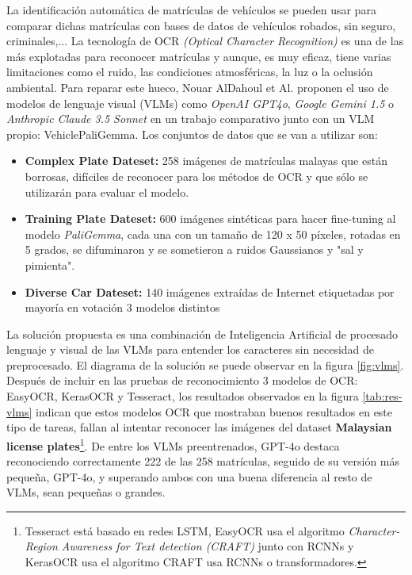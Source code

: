\documentclass[11pt]{article}
\begin{document}
La identificación automática de matrículas de vehículos se pueden usar para comparar dichas matrículas con bases de datos de vehículos robados, sin seguro, criminales,... La tecnología de OCR \textit{(Optical Character Recognition)} es una de las más explotadas para reconocer matrículas y aunque, es muy eficaz, tiene varias limitaciones como el ruido, las condiciones atmosféricas, la luz o la oclusión ambiental. Para reparar este hueco, Nouar AlDahoul et Al.\cite{aldahoul2024advancingvehicleplaterecognition} proponen el uso de modelos de lenguaje visual (VLMs) como \textit{OpenAI GPT4o}, \textit{Google Gemini 1.5} o \textit{Anthropic Claude 3.5 Sonnet} en un trabajo comparativo junto con un VLM propio: VehiclePaliGemma. Los conjuntos de datos que se van a utilizar son:
\begin{itemize}
    \item \textbf{Complex Plate Dateset:} 258 imágenes de matrículas malayas que están borrosas, difíciles de reconocer para los métodos de OCR y que sólo se utilizarán para evaluar el modelo.
    \item \textbf{Training Plate Dateset:} 600 imágenes sintéticas para hacer fine-tuning al modelo \textit{PaliGemma}, cada una con un tamaño de 120 x 50 píxeles, rotadas en 5 grados, se difuminaron y se sometieron a ruidos Gaussianos y "sal y pimienta".
    \item \textbf{Diverse Car Dateset:} 140 imágenes extraídas de Internet etiquetadas por mayoría en votación 3 modelos distintos 
\end{itemize}
La solución propuesta es una combinación de Inteligencia Artificial de procesado lenguaje y visual de las VLMs para entender los caracteres sin necesidad de preprocesado. El diagrama de la solución se puede observar en la figura \ref{fig:vlms}. Después de incluir en las pruebas de reconocimiento 3 modelos de OCR: EasyOCR, KerasOCR y Tesseract, los resultados observados en la figura \ref{tab:res-vlms} indican que estos modelos OCR que mostraban buenos resultados en este tipo de tareas, fallan al intentar reconocer las imágenes del dataset \textbf{Malaysian license plates}\footnote{Tesseract está basado en redes LSTM, EasyOCR usa el algoritmo \textit{Character-Region Awareness for Text detection (CRAFT)} junto con RCNNs y KerasOCR usa el algoritmo CRAFT usa RCNNs o transformadores.}. De entre los VLMs preentrenados, GPT-4o destaca reconociendo correctamente 222 de las 258 matrículas, seguido de su versión más pequeña, GPT-4o, y superando ambos con una buena diferencia al resto de VLMs, sean pequeñas o grandes. 
\end{document}
